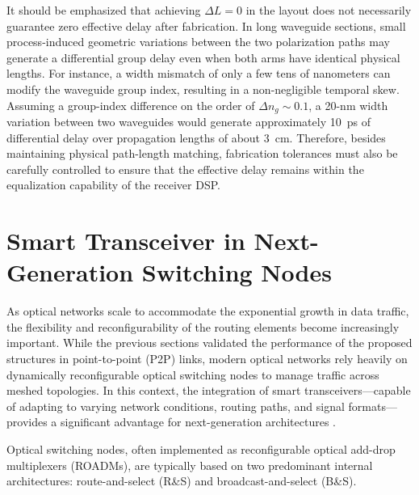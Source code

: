 It should be emphasized that achieving $\Delta L = 0$ in the layout does not necessarily guarantee
zero effective delay after fabrication. In long waveguide sections, small process-induced geometric
variations between the two polarization paths may generate a differential group delay even when both
arms have identical physical lengths. For instance, a width mismatch of only a few tens of
nanometers can modify the waveguide group index, resulting in a non-negligible temporal skew.
Assuming a group-index difference on the order of $\Delta n_g \sim 0.1$, a 20-nm width variation
between two waveguides would generate approximately 10~ps of differential delay over propagation
lengths of about 3~cm. Therefore, besides maintaining physical path-length matching, fabrication
tolerances must also be carefully controlled to ensure that the effective delay remains within the
equalization capability of the receiver DSP.

\clearpage

\section{Smart Transceiver in Next-Generation Switching Nodes}
\label{sec:switching_nodes}

\let\thefootnote\relax{}

As optical networks scale to accommodate the exponential growth in data traffic, the flexibility 
and reconfigurability of the routing elements become increasingly important. While the previous 
sections validated the performance of the proposed structures in point-to-point (P2P) links, modern 
optical networks rely heavily on dynamically reconfigurable optical switching nodes to manage 
traffic across meshed topologies. In this context, the integration of smart transceivers—capable of 
adapting to varying network conditions, routing paths, and signal formats—provides a significant 
advantage for next-generation architectures \cite{bhat6GEcosystemCurrent2021, 
welchPointtoMultipointOpticalNetworks2021}.

Optical switching nodes, often implemented as reconfigurable optical add-drop multiplexers 
(ROADMs), are typically based on two predominant internal architectures: route-and-select (R\&S) 
and broadcast-and-select (B\&S). 

